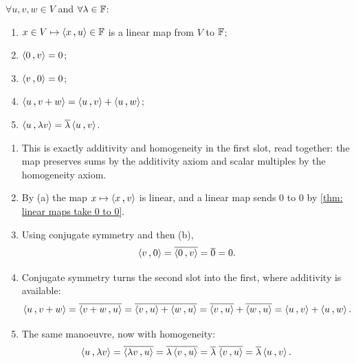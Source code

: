 \begin{thm}
  $\forall u,v,w \in V$ and $\forall \lambda \in \mathbb{F}$:
  \begin{enumerate}[label=\textbf{(\alph*)}]
    \item $x \in V \mapsto \ip{x}{u} \in \myF$ is a linear map from $V$ to $\mathbb{F}$;
    \item $\ip{0}{v} = 0$;
    \item $\ip{v}{0} = 0$;
    \item $\ip{u}{v+w} = \ip{u}{v} + \ip{u}{w}$;
    \item $\ip{u}{\lambda v} = \overline{\lambda} \ip{u}{v}$.
  \end{enumerate}
\end{thm}
\begin{prf}
  \begin{enumerate}[label=\textbf{(\alph*)}]
    \item This is exactly additivity and homogeneity in the first slot, read together: the map preserves sums by the additivity axiom and scalar multiples by the homogeneity axiom.
    \item By (a) the map $x \mapsto \ip{x}{v}$ is linear, and a linear map sends $0$ to $0$ by \ref{thm: linear maps take 0 to 0}.
    \item Using conjugate symmetry and then (b),
    \begin{equation}
      \ip{v}{0} = \overline{\ip{0}{v}} = \overline{0} = 0.
    \end{equation}
    \item Conjugate symmetry turns the second slot into the first, where additivity is available:
    \begin{equation}
      \ip{u}{v+w} = \overline{\ip{v+w}{u}} = \overline{\ip{v}{u} + \ip{w}{u}} = \overline{\ip{v}{u}} + \overline{\ip{w}{u}} = \ip{u}{v} + \ip{u}{w}.
    \end{equation}
    \item The same manoeuvre, now with homogeneity:
    \begin{equation}
      \ip{u}{\lambda v} = \overline{\ip{\lambda v}{u}} = \overline{\lambda \ip{v}{u}} = \overline{\lambda} \; \overline{\ip{v}{u}} = \overline{\lambda} \ip{u}{v}.
    \end{equation}
  \end{enumerate}
  \vspace{-1em}
\end{prf}

